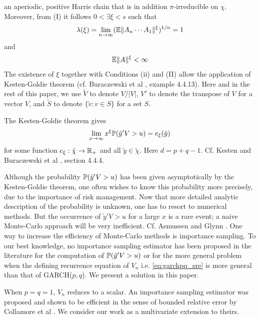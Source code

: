\documentclass[aoas,preprint]{imsart}
\numberwithin{equation}{section}
\theoremstyle{plain}
\begin{document}
an aperiodic, positive Harris chain that is in addition
$\pi$-irreducible on $\chi$.
Moreover, from (I) it follows $0 < \exists \xi < s$ such that
\begin{equation}
  \label{eq:hyt}
  \lambda(\xi) = \lim_{n \to \infty} (\E \|A_n \cdots A_1\|^\xi)^{1/n} = 1
\end{equation}
and
\begin{equation}
  \label{eq:jui}
  \E \|A\|^\xi < \infty
\end{equation}
The existence of $\xi$ together with Conditions (ii) and (II)
allow the application of Kesten-Goldie theorem (cf. Buraczewski et al
\cite{buraczewski:damek:mikosch:2016}, example 4.4.13). Here and in
the rest of this paper, we use $\tilde V$ to denote $V/|V|$, $V'$ to
denote the transpose of $V$ for a vector $V$,
and $\tilde S$ to denote $\{\tilde v: v \in S\}$ for a set $S$.

The Kesten-Goldie theorem gives
\begin{equation}
  \label{eq:kesten}
  \lim_{x \to \infty} x^{\xi} \P(\tilde y' V > u) = e_\xi(\tilde y)  
\end{equation}
for some function $e_\xi: \tilde \chi \to \reals_+$ and
all $\tilde y \in \tilde \chi$. Here $d = p + q - 1$. Cf. Kesten
\cite{kesten:1973} and  Buraczewski et al
\cite{buraczewski:damek:mikosch:2016},
section 4.4.4.

Although the probability $\P(\tilde y' V > u)$ has been given
asymptotically by the Kesten-Goldie theorem, one often wishes to know
this probability more precisely, due to the importance of risk
management. Now that more detailed analytic description of the
probability is unknown, one has to resort to numerical methods. But
the occurrence of $\tilde y' V > u$ for a large $x$ is a rare event; a
naive Monte-Carlo approach will be very inefficient. Cf. Asmussen and
Glynn \cite{opac-b1123521}.
One way to increase the efficiency of Monte-Carlo methods is
importance sampling. To our best knowledge, no importance sampling
estimator has been proposed in the literature for the computation of
$\P(\tilde y' V > u)$ or for the more general problem when the
defining recurrence equation of $V_n$ i.e. \eqref{eq:garchpq_sre} is 
more general than that of GARCH($p, q$). We present a solution in this
paper.

When $p = q = 1$, $V_n$ reduces to a scalar. An importance sampling
estimator was proposed and shown to be efficient in the sense of
bounded relative error by Collamore et al \cite{collamore2014}. We
consider our work as a multivariate extension to theirs.
\end{document}
